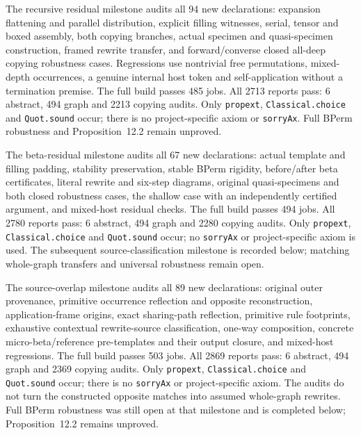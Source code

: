 The recursive residual milestone audits all 94 new declarations: expansion
flattening and parallel distribution, explicit filling witnesses, serial,
tensor and boxed assembly, both copying branches, actual specimen and
quasi-specimen construction, framed rewrite transfer, and forward/converse
closed all-deep copying robustness cases. Regressions use nontrivial free
permutations, mixed-depth occurrences, a genuine internal host token and
self-application without a termination premise. The full build passes 485
jobs. All 2713 reports pass: 6 abstract, 494 graph and 2213 copying audits.
Only \texttt{propext}, \texttt{Classical.choice} and \texttt{Quot.sound} occur;
there is no project-specific axiom or \texttt{sorryAx}. Full BPerm robustness
and Proposition~12.2 remain unproved.


The beta-residual milestone audits all 67 new declarations: actual template
and filling padding, stability preservation, stable BPerm rigidity, before/after
beta certificates, literal rewrite and six-step diagrams, original
quasi-specimens and both closed robustness cases, the shallow case with an
independently certified argument, and mixed-host residual checks. The full
build passes 494 jobs. All 2780 reports pass: 6 abstract, 494 graph and 2280
copying audits. Only \texttt{propext}, \texttt{Classical.choice} and
\texttt{Quot.sound} occur; no \texttt{sorryAx} or project-specific axiom is
used. The subsequent source-classification milestone is recorded below;
matching whole-graph transfers and universal robustness remain open.


The source-overlap milestone audits all 89 new declarations: original outer
provenance, primitive occurrence reflection and opposite reconstruction,
application-frame origins, exact sharing-path reflection, primitive rule
footprints, exhaustive contextual rewrite-source classification, one-way
composition, concrete micro-beta/reference pre-templates and their output
closure, and mixed-host regressions. The full build passes 503 jobs. All
2869 reports pass: 6 abstract, 494 graph and 2369 copying audits. Only
\texttt{propext}, \texttt{Classical.choice} and \texttt{Quot.sound} occur;
there is no \texttt{sorryAx} or project-specific axiom. The audits do not
turn the constructed opposite matches into assumed whole-graph rewrites.
Full BPerm robustness was still open at that milestone and is completed below;
Proposition~12.2 remains unproved.


